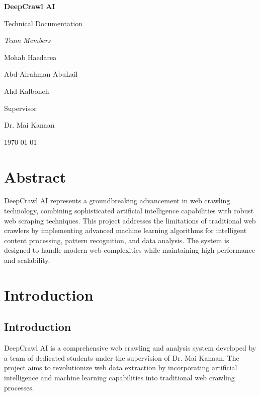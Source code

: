 \documentclass[12pt,a4paper]{report}
\begin{document}
\begin{titlepage}
    \centering
    \vspace*{2cm}
    {\Huge\bfseries DeepCrawl AI\par}
    \vspace{1cm}
    {\Large Technical Documentation\par}
    \vspace{2cm}
    {\Large\itshape Team Members\par}
    \vspace{0.5cm}
    {\large Mohab Haedarea\par}
    {\large Abd-Alrahman AbuLail\par}
    {\large Ahd Kalboneh\par}
    \vspace{1cm}
    {\large Supervisor\par}
    {\large Dr. Mai Kanaan\par}
    \vfill
    {\large \today\par}
\end{titlepage}

\tableofcontents
\newpage

\chapter*{Abstract}
DeepCrawl AI represents a groundbreaking advancement in web crawling technology, combining sophisticated artificial intelligence capabilities with robust web scraping techniques. This project addresses the limitations of traditional web crawlers by implementing advanced machine learning algorithms for intelligent content processing, pattern recognition, and data analysis. The system is designed to handle modern web complexities while maintaining high performance and scalability.

\chapter{Introduction}
\section{Introduction}
DeepCrawl AI is a comprehensive web crawling and analysis system developed by a team of dedicated students under the supervision of Dr. Mai Kanaan. The project aims to revolutionize web data extraction by incorporating artificial intelligence and machine learning capabilities into traditional web crawling processes.
\end{document}
